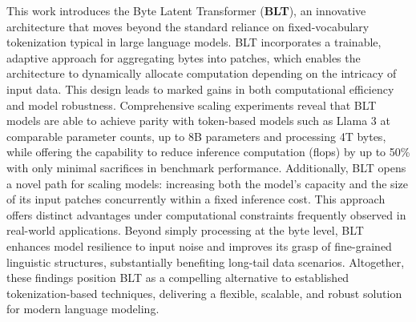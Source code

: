 This work introduces the Byte Latent Transformer (\textbf{BLT}), an innovative architecture that moves beyond the standard reliance on fixed-vocabulary tokenization typical in large language models. {\textsc BLT} incorporates a trainable, adaptive approach for aggregating bytes into patches, which enables the architecture to dynamically allocate computation depending on the intricacy of input data. This design leads to marked gains in both computational efficiency and model robustness. Comprehensive scaling experiments reveal that {\textsc BLT} models are able to achieve parity with token-based models such as Llama 3 at comparable parameter counts, up to 8B parameters and processing 4T bytes, while offering the capability to reduce inference computation (flops) by up to 50\% with only minimal sacrifices in benchmark performance. Additionally, {\textsc BLT} opens a novel path for scaling models: increasing both the model's capacity and the size of its input patches concurrently within a fixed inference cost. This approach offers distinct advantages under computational constraints frequently observed in real-world applications. Beyond simply processing at the byte level, {\textsc BLT} enhances model resilience to input noise and improves its grasp of fine-grained linguistic structures, substantially benefiting long-tail data scenarios. Altogether, these findings position {\textsc BLT} as a compelling alternative to established tokenization-based techniques, delivering a flexible, scalable, and robust solution for modern language modeling.

